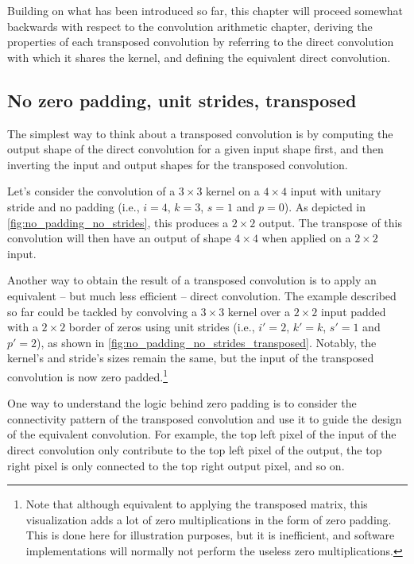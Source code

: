 Building on what has been introduced so far, this chapter will proceed somewhat
backwards with respect to the convolution arithmetic chapter, deriving the
properties of each transposed convolution by referring to the direct
convolution with which it shares the kernel, and defining the equivalent direct
convolution.

\subsection{No zero padding, unit strides, transposed}

The simplest way to think about a transposed convolution is by computing the
output shape of the direct convolution for a given input shape first, and then
inverting the input and output shapes for the transposed convolution.

Let's consider the convolution of a $3 \times 3$ kernel on a $4 \times 4$
input with unitary stride and no padding (i.e., $i = 4$, $k = 3$, $s = 1$ and
$p = 0$). As depicted in \autoref{fig:no_padding_no_strides}, this produces a
$2 \times 2$ output. The transpose of this convolution will then have an output
of shape $4 \times 4$ when applied on a $2 \times 2$ input.

Another way to obtain the result of a transposed convolution is to apply an
equivalent -- but much less efficient -- direct convolution. The example
described so far could be tackled by convolving a $3 \times 3$ kernel over a
$2 \times 2$ input padded with a $2 \times 2$ border of zeros using unit
strides (i.e., $i' = 2$, $k' = k$, $s' = 1$ and $p' = 2$), as shown in
\autoref{fig:no_padding_no_strides_transposed}. Notably, the kernel's and
stride's sizes remain the same, but the input of the transposed convolution is
now zero padded.\footnote{Note that although
    equivalent to applying the transposed matrix, this visualization adds a lot
    of zero multiplications in the form of zero padding.  This is done here for
    illustration purposes, but it is inefficient, and software implementations
    will normally not perform the useless zero multiplications.}

One way to understand the logic behind zero padding is to consider the
connectivity pattern of the transposed convolution and use it to guide the
design of the equivalent convolution. For example, the top left pixel of the
input of the direct convolution only contribute to the top left pixel of the
output, the top right pixel is only connected to the top right output pixel,
and so on.

